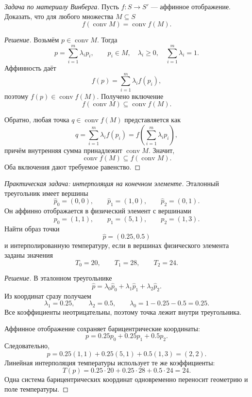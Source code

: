 \begin{problem}
\textit{Задача по материалу Винберга.}
Пусть \(f:S\to S'\) --- аффинное отображение. Доказать, что для любого множества \(M\subseteq S\)
\[
f(\operatorname{conv}M)
=
\operatorname{conv}f(M).
\]
\end{problem}

\begin{proof}[Решение]
Возьмём \(p\in\operatorname{conv}M\). Тогда
\[
p=\sum_{i=1}^{m}\lambda_ip_i,
\qquad
p_i\in M,\quad
\lambda_i\geq0,\quad
\sum_{i=1}^{m}\lambda_i=1.
\]
Аффинность даёт
\[
f(p)
=
\sum_{i=1}^{m}\lambda_if(p_i),
\]
поэтому \(f(p)\in\operatorname{conv}f(M)\). Получено включение
\[
f(\operatorname{conv}M)
\subseteq
\operatorname{conv}f(M).
\]

Обратно, любая точка \(q\in\operatorname{conv}f(M)\) представляется как
\[
q=\sum_{i=1}^{m}\lambda_if(p_i)
=
f\left(\sum_{i=1}^{m}\lambda_ip_i\right),
\]
причём внутренняя сумма принадлежит \(\operatorname{conv}M\). Значит,
\[
\operatorname{conv}f(M)
\subseteq
f(\operatorname{conv}M).
\]
Оба включения дают требуемое равенство.
\end{proof}

\begin{problem}
\textit{Практическая задача: интерполяция на конечном элементе.}
Эталонный треугольник имеет вершины
\[
\widehat p_0=(0,0),
\qquad
\widehat p_1=(1,0),
\qquad
\widehat p_2=(0,1).
\]
Он аффинно отображается в физический элемент с вершинами
\[
p_0=(1,1),
\qquad
p_1=(5,1),
\qquad
p_2=(1,3).
\]
Найти образ точки
\[
\widehat p=(0.25,0.5)
\]
и интерполированную температуру, если в вершинах физического элемента заданы значения
\[
T_0=20,\qquad T_1=28,\qquad T_2=24.
\]
\end{problem}

\begin{proof}[Решение]
В эталонном треугольнике
\[
\widehat p
=
\lambda_0\widehat p_0
+\lambda_1\widehat p_1
+\lambda_2\widehat p_2.
\]
Из координат сразу получаем
\[
\lambda_1=0.25,
\qquad
\lambda_2=0.5,
\qquad
\lambda_0=1-0.25-0.5=0.25.
\]
Все коэффициенты неотрицательны, поэтому точка лежит внутри треугольника.

Аффинное отображение сохраняет барицентрические координаты:
\[
p
=
0.25p_0+0.25p_1+0.5p_2.
\]
Следовательно,
\[
p
=
0.25(1,1)+0.25(5,1)+0.5(1,3)
=
(2,2).
\]
Линейная интерполяция температуры использует те же коэффициенты:
\[
T(p)
=
0.25\cdot20
+0.25\cdot28
+0.5\cdot24
=
24.
\]
Одна система барицентрических координат одновременно переносит геометрию и поле температуры.
\end{proof}


